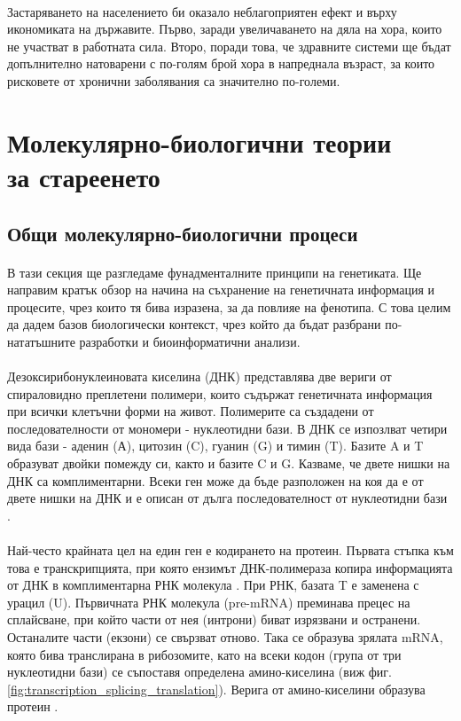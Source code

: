 \documentclass[pdftex,cyrillic,14pt,a4page,twoside]{extreport}
\begin{document}
\paragraph{}
Застаряването на населението би оказало неблагоприятен ефект и върху икономиката на държавите. Първо, заради увеличаването на дяла на хора, които не участват в работната сила. Второ, поради това, че здравните системи ще бъдат допълнително натоварени с по-голям брой хора в напреднала възраст, за които рисковете от хронични заболявания са значително по-големи.


\section[Молекулярно-биологични теории за стареенето]{Молекулярно-биологични теории\\ за стареенето}
\subsection{Общи молекулярно-биологични процеси}
\paragraph{}
В тази секция ще разгледаме фунадменталните принципи на генетиката. Ще направим кратък обзор на начина на съхранение на генетичната информация и процесите, чрез които тя бива изразена, за да повлияе на фенотипа. С това целим да дадем базов биологически контекст, чрез който да бъдат разбрани по-нататъшните разработки и биоинформатични анализи.

\paragraph{}
Дезоксирибонуклеиновата киселина (ДНК) представлява две вериги от спираловидно преплетени полимери, които съдържат генетичната информация при всички клетъчни форми на живот. Полимерите са създадени от последователности от мономери - нуклеотидни бази. В ДНК се изпозлват четири вида бази - аденин (А), цитозин (C), гуанин (G) и тимин (T). Базите A и T образуват двойки помежду си, както и базите C и G. Казваме, че двете нишки на ДНК са комплиментарни. Всеки ген може да бъде разположен на коя да е от двете нишки на ДНК и е описан от дълга последователност от нуклеотидни бази \cite[стр. 301-310]{klug2014}.

\paragraph{}
Най-често крайната цел на един ген е кодирането на протеин. Първата стъпка към това е транскрипцията, при която ензимът ДНК-полимераза копира информацията от ДНК в комплиментарна РНК молекула \cite{sims2004}. При РНК, базата T е заменена с урацил (U). Първичната РНК молекула (pre-mRNA) преминава прецес на сплайсване, при който части от нея (интрони) биват изрязвани и остранени. Останалите части (екзони) се свързват отново. Така се образува зрялата mRNA, която бива транслирана в рибозомите, като на всеки кодон (група от три нуклеотидни бази) се съпоставя определена амино-киселина (виж фиг. \ref{fig:transcription_splicing_translation}). Верига от амино-киселини образува протеин \cite[стр. 412-420]{klug2014}.
\end{document}

